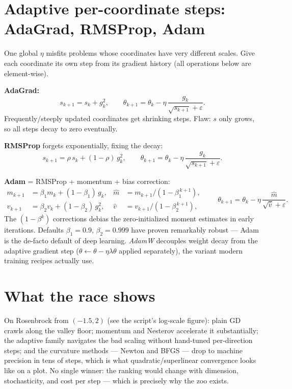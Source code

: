 \documentclass[11pt]{article}
\begin{document}
\section{Adaptive per-coordinate steps: AdaGrad, RMSProp, Adam}

One global $\eta$ misfits problems whose coordinates have very different
scales. Give each coordinate its own step from its gradient history
(all operations below are element-wise).

\textbf{AdaGrad:}
\begin{equation}
  s_{k+1} = s_k + g_k^2,
  \qquad
  \theta_{k+1} = \theta_k - \eta\, \frac{g_k}{\sqrt{s_{k+1}}+\varepsilon}.
  \label{eq:adagrad}
\end{equation}
Frequently/steeply updated coordinates get shrinking steps. Flaw: $s$ only
grows, so all steps decay to zero eventually.

\textbf{RMSProp} forgets exponentially, fixing the decay:
\begin{equation}
  s_{k+1} = \rho\, s_k + (1-\rho)\, g_k^2,
  \qquad
  \theta_{k+1} = \theta_k - \eta\, \frac{g_k}{\sqrt{s_{k+1}}+\varepsilon}.
  \label{eq:rmsprop}
\end{equation}

\textbf{Adam} = RMSProp + momentum + bias correction:
\begin{equation}
  \begin{aligned}
    m_{k+1} &= \beta_1 m_k + (1-\beta_1)\, g_k,
    &\hat m &= m_{k+1}/(1-\beta_1^{\,k+1}),\\
    v_{k+1} &= \beta_2 v_k + (1-\beta_2)\, g_k^2,
    &\hat v &= v_{k+1}/(1-\beta_2^{\,k+1}),
  \end{aligned}
  \qquad
  \theta_{k+1} = \theta_k - \eta\, \frac{\hat m}{\sqrt{\hat v}+\varepsilon}.
  \label{eq:adam}
\end{equation}
The $(1-\beta^{k})$ corrections debias the zero-initialized moment
estimates in early iterations. Defaults $\beta_1=0.9$, $\beta_2=0.999$
have proven remarkably robust — Adam is the de-facto default of deep
learning. \emph{AdamW} decouples weight decay from the adaptive gradient
step ($\theta \leftarrow \theta - \eta\lambda\theta$ applied separately),
the variant modern training recipes actually use.

\section{What the race shows}

On Rosenbrock from $(-1.5, 2)$ (see the script's log-scale figure):
plain GD crawls along the valley floor; momentum and Nesterov accelerate
it substantially; the adaptive family navigates the bad scaling without
hand-tuned per-direction steps; and the curvature methods --- Newton and
BFGS --- drop to machine precision in tens of steps, which is what
quadratic/superlinear convergence looks like on a plot. No single winner:
the ranking would change with dimension, stochasticity, and cost per
step --- which is precisely why the zoo exists.
\end{document}
